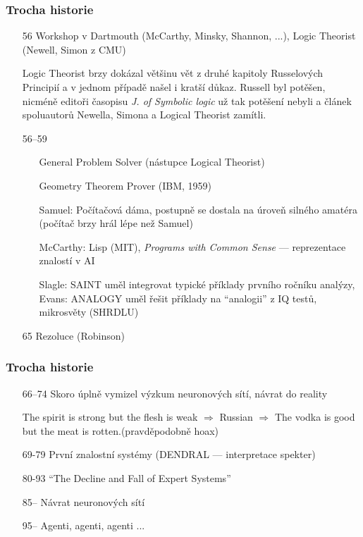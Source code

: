\documentclass[red,handout,professionalfont]{beamer}
\theoremstyle{definition}
\newcommand{\0}{\mbox{${\bf 0}$}}
\begin{document}
\begin{frame}\frametitle{Trocha historie}
 \begin{itemize}
 \item[56] Workshop v Dartmouth (McCarthy, Minsky, Shannon, ...), Logic Theorist (Newell, Simon z CMU)\pause{}
 \begin{block}{}
  \small
  Logic Theorist brzy dokázal většinu vět z druhé kapitoly Russelových Principií a v jednom případě našel i kratší důkaz.
  Russell byl potěšen, nicméně editoři časopisu {\it J. of Symbolic logic} už tak potěšení nebyli a článek spoluautorů
  Newella, Simona a Logical Theorist zamítli. 
 \end{block}\pause{}
 \item[56--59] 
 \begin{itemize}
   \item[] General Problem Solver (nástupce Logical Theorist)\pause{}
   \item[] Geometry Theorem Prover (IBM, 1959)\pause{}
   \item[] Samuel: Počítačová dáma, postupně se dostala na úroveň silného amatéra (počítač brzy hrál lépe než Samuel)\pause{}
   \item[] McCarthy: Lisp (MIT), {\it Programs with Common Sense} --- reprezentace znalostí v AI\pause{}
   \item[] Slagle: SAINT uměl integrovat typické příklady prvního ročníku analýzy, Evans: ANALOGY uměl řešit příklady
           na ``analogii'' z IQ testů, mikrosvěty (SHRDLU)\pause{}
 \end{itemize}
 \item[65] Rezoluce (Robinson)
\end{itemize}
\end{frame}
\begin{frame}\frametitle{Trocha historie}
\begin{itemize}
 \item[66--74] Skoro úplně vymizel výzkum neuronových sítí\pause{}, návrat do reality\pause{}
 \begin{block}{}
 \small
 The spirit is strong but the flesh is weak $\Rightarrow$
Russian %
 $\Rightarrow$ The vodka is good but the meat is rotten.\pause{}(pravděpodobně hoax)
 \end{block}\pause{}

 \item[69-79] První znalostní systémy (DENDRAL --- interpretace spekter)\pause{}
 \item[80-93] ``The Decline and Fall of Expert Systems''\pause{}
 \item[85--] Návrat neuronových sítí\pause{}
 \item[95--] Agenti, agenti, agenti ...
\end{itemize}
\end{frame}
\end{document}
